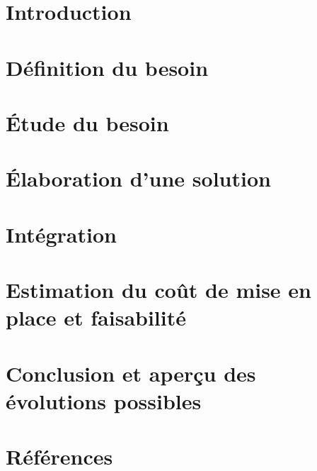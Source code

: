 \documentclass[11pt]{article}
\begin{document}
\newpage

\section{Introduction}

	

\newpage
\section{Définition du besoin}

	
\newpage
\section{Étude du besoin}

	

\newpage
\section{Élaboration d'une solution}

	

\newpage
\section{Intégration}

	

\newpage
\section{Estimation du coût de mise en place et faisabilité}

	

\newpage
\section{Conclusion et aperçu des évolutions possibles}
	
	

\setcounter{secnumdepth}{0}
\renewcommand{\thesubsection}{\Alph{subsection}}

\newpage
{}

	

\setcounter{secnumdepth}{0}
\newpage
\section{Références}
\end{document}
